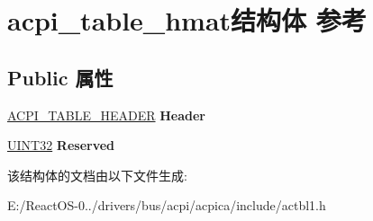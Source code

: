\hypertarget{structacpi__table__hmat}{}\section{acpi\+\_\+table\+\_\+hmat结构体 参考}
\label{structacpi__table__hmat}
\subsection*{Public 属性}
\begin{DoxyCompactItemize}
\item 
\mbox{\label{structacpi__table__hmat_ace84b34c77382eca2c8b2b968dcb8952}} 
\hyperlink{structacpi__table__header}{A\+C\+P\+I\+\_\+\+T\+A\+B\+L\+E\+\_\+\+H\+E\+A\+D\+ER} {\bfseries Header}
\item 
\mbox{\label{structacpi__table__hmat_ad8e6b1d9caac9d325592436f88c99718}} 
\hyperlink{_processor_bind_8h_ae1e6edbbc26d6fbc71a90190d0266018}{U\+I\+N\+T32} {\bfseries Reserved}
\end{DoxyCompactItemize}


该结构体的文档由以下文件生成\+:\begin{DoxyCompactItemize}
\item 
E\+:/\+React\+O\+S-\/0../drivers/bus/acpi/acpica/include/actbl1.\+h\end{DoxyCompactItemize}
